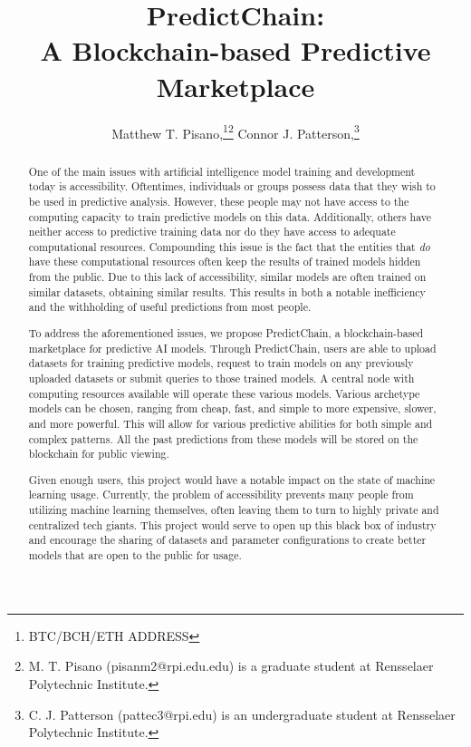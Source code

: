 \documentclass{ledger}
\title{PredictChain:\\
A Blockchain-based Predictive Marketplace}
\author{
    Matthew T. Pisano,\thanks{BTC/BCH/ETH ADDRESS}\thanks{M. T. Pisano (pisanm2@rpi.edu.edu) is a graduate
    student at Rensselaer Polytechnic Institute.} 
    Connor J. Patterson,\thanks{C. J. Patterson (pattec3@rpi.edu) is an undergraduate student at
    Rensselaer Polytechnic Institute.}
}
\begin{document}
\maketitle

\thispagestyle{pagefirst}

\begin{abstract}
One of the main issues with artificial intelligence model training and development today is accessibility. Oftentimes,
individuals or groups possess data that they wish to be used in predictive analysis. However, these people may not have
access to the computing capacity to train predictive models on this data.  Additionally, others have neither access to
predictive training data nor do they have access to adequate computational resources. Compounding this issue is the fact
that the entities that \textit{do} have these computational resources often keep the results of trained models hidden
from the public.  Due to this lack of accessibility, similar models are often trained on similar datasets, obtaining
similar results.  This results in both a notable inefficiency and the withholding of useful predictions from most people.

To address the aforementioned issues, we propose PredictChain, a blockchain-based marketplace for predictive AI models.
Through PredictChain, users are able to upload datasets for training predictive models, request to train models on any
previously uploaded datasets or submit queries to those trained models.  A central node with computing resources available
will operate these various models. Various archetype models can be chosen, ranging from cheap, fast, and simple to more
expensive, slower, and more powerful.  This will allow for various predictive abilities for both simple and complex patterns.
All the past predictions from these models will be stored on the blockchain for public viewing.

Given enough users, this project would have a notable impact on the state of machine learning usage.  Currently, the
problem of accessibility prevents many people from utilizing machine learning themselves, often leaving them to turn
to highly private and centralized tech giants.  This project would serve to open up this black box of industry and
encourage the sharing of datasets and parameter configurations to create better models that are open to the public for usage.



\end{abstract}
\end{document}
